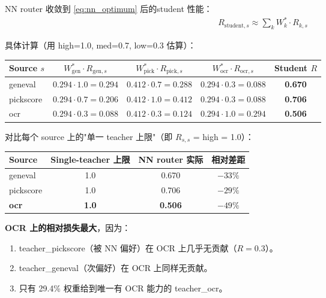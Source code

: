 \documentclass[11pt,a4paper]{article}
\begin{document}
NN router 收敛到 \eqref{eq:nn_optimum} 后的student 性能：
\begin{align}
R_{\text{student}, s} \approx \sum_k W^*_k \cdot R_{k,s}
\end{align}

具体计算（用 high=1.0, med=0.7, low=0.3 估算）：

\begin{center}
\begin{tabular}{l|ccc|c}
\toprule
\textbf{Source $s$} & \textbf{$W^*_{\text{gen}}{\cdot}R_{\text{gen},s}$} & \textbf{$W^*_{\text{pick}}{\cdot}R_{\text{pick},s}$} & \textbf{$W^*_{\text{ocr}}{\cdot}R_{\text{ocr},s}$} & \textbf{Student $R$} \\
\midrule
geneval  & $0.294 {\cdot} 1.0 = 0.294$ & $0.412 {\cdot} 0.7 = 0.288$ & $0.294 {\cdot} 0.3 = 0.088$ & \textbf{0.670} \\
pickscore & $0.294 {\cdot} 0.7 = 0.206$ & $0.412 {\cdot} 1.0 = 0.412$ & $0.294 {\cdot} 0.3 = 0.088$ & \textbf{0.706} \\
ocr      & $0.294 {\cdot} 0.3 = 0.088$ & $0.412 {\cdot} 0.3 = 0.124$ & $0.294 {\cdot} 1.0 = 0.294$ & \textbf{0.506} \\
\bottomrule
\end{tabular}
\end{center}

对比每个 source 上的"单一 teacher 上限"（即 $R_{s,s}$ = high = 1.0）：

\begin{center}
\begin{tabular}{l|c|c|c}
\toprule
\textbf{Source} & \textbf{Single-teacher 上限} & \textbf{NN router 实际} & \textbf{相对差距} \\
\midrule
geneval & 1.0 & 0.670 & $-33\%$ \\
pickscore & 1.0 & 0.706 & $-29\%$ \\
\textbf{ocr} & \textbf{1.0} & \textbf{0.506} & \textbf{$-49\%$} \\
\bottomrule
\end{tabular}
\end{center}

\textbf{OCR 上的相对损失最大}，因为：
\begin{enumerate}
    \item teacher\_pickscore（被 NN 偏好）在 OCR 上几乎无贡献（$R = 0.3$）。
    \item teacher\_geneval（次偏好）在 OCR 上同样无贡献。
    \item 只有 29.4\% 权重给到唯一有 OCR 能力的 teacher\_ocr。
\end{enumerate}
\end{document}
